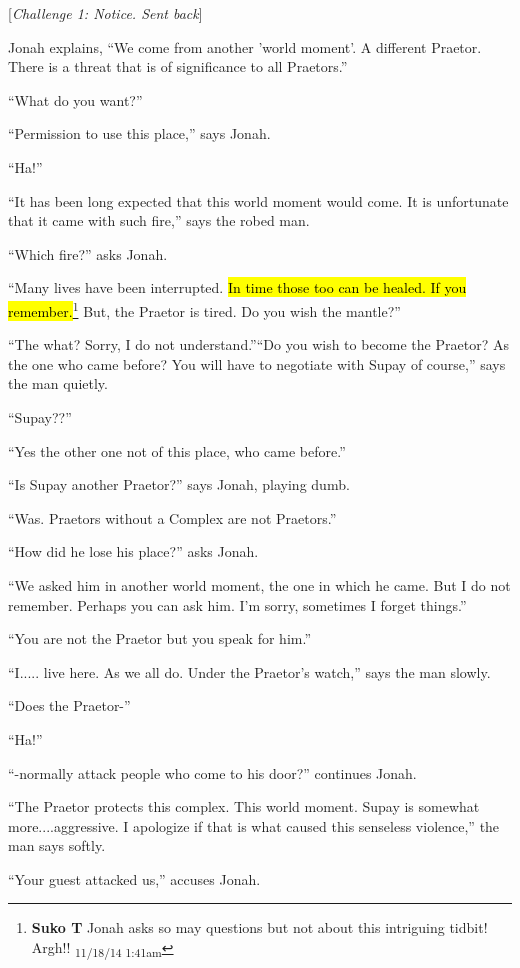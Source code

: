 {{[}\textit{Challenge 1: Notice.  Sent back}{]}

Jonah explains, ``We come from another 'world moment'.  A different Praetor.  There is a threat that is of significance to all Praetors.''

``What do you want?''

``Permission to use this place,'' says Jonah.

``Ha!''

``It has been long expected that this world moment would come.  It is unfortunate that it came with such fire,'' says the robed man.

``Which fire?'' asks Jonah.

``Many lives have been interrupted.  \hl{In time those too can be healed.  If you remember.}\footnote{\textbf{Suko T }Jonah asks so may questions but not about this intriguing tidbit! Argh!! \textsubscript{11/18/14 1:41am}} But, the Praetor is tired.  Do you wish the mantle?''

``The what? Sorry, I do not understand.''``Do you wish to become the Praetor?  As the one who came before?  You will have to negotiate with Supay of course,'' says the man quietly.

``Supay??''

``Yes the other one not of this place, who came before.''

``Is Supay another Praetor?'' says Jonah, playing dumb.

``Was. Praetors without a Complex are not Praetors.''

``How did he lose his place?'' asks Jonah.

``We asked him in another world moment, the one in which he came. But I do not remember.  Perhaps you can ask him.  I'm sorry, sometimes I forget things.''

``You are not the Praetor but you speak for him.''

``I..... live here.  As we all do.  Under the Praetor's watch,'' says the man slowly.

``Does the Praetor-''

``Ha!''

``-normally attack people who come to his door?'' continues Jonah.

``The Praetor protects this complex.  This world moment.  Supay is somewhat more....aggressive.  I apologize if that is what caused this senseless violence,''  the man says softly.

``Your guest attacked us,'' accuses Jonah.

}
